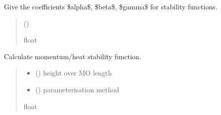 \documentclass[letterpaper,10pt,english]{sphinxmanual}
\begin{document}
\begin{fulllineitems}
\label{\detokenize{users_guide:AirSeaFluxCode.flux_subs.stratification.get_stabco}}
\pysigstartsignatures
{}
\pysigstopsignatures
\sphinxAtStartPar
Give the coefficients \$alpha\$, \$beta\$, \$gamma\$ for stability functions.
\begin{quote}\begin{description}
\sphinxAtStartPar
{} () \textendash{} 

\sphinxAtStartPar
{}

\sphinxAtStartPar
float

\end{description}\end{quote}

\end{fulllineitems}


\begin{fulllineitems}
\label{\detokenize{users_guide:AirSeaFluxCode.flux_subs.stratification.psi_Bel}}
\pysigstartsignatures
{}
\pysigstopsignatures
\sphinxAtStartPar
Calculate momentum/heat stability function.
\begin{quote}\begin{description}
\begin{itemize}
\item {} 
\sphinxAtStartPar
{} () \textendash{} height over MO length

\item {} 
\sphinxAtStartPar
{} () \textendash{} parameterisation method

\end{itemize}

\sphinxAtStartPar
{}

\sphinxAtStartPar
float

\end{description}\end{quote}

\end{fulllineitems}
\end{document}
